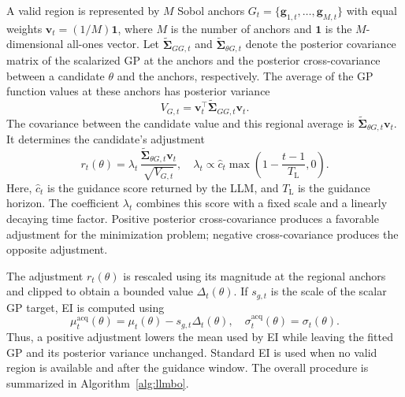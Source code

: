 \documentclass[lettersize,journal]{IEEEtran}
\begin{document}
A valid region is represented by $M$ Sobol anchors
$G_t=\{\mathbf g_{1,t},\ldots,\mathbf g_{M,t}\}$ with equal weights
$\mathbf v_t=(1/M)\mathbf 1$, where $M$ is the number of anchors and
$\mathbf 1$ is the $M$-dimensional all-ones vector. Let
$\widetilde{\boldsymbol\Sigma}_{GG,t}$ and
$\widetilde{\boldsymbol\Sigma}_{\theta G,t}$ denote the posterior covariance
matrix of the scalarized GP at the anchors and the posterior cross-covariance
between a candidate $\theta$ and the anchors, respectively. The average of
the GP function values at these anchors has posterior variance
\begin{equation}
 V_{G,t}=\mathbf v_t^{\top}
 \widetilde{\boldsymbol\Sigma}_{GG,t}\mathbf v_t.
 \label{eq:region_variance}
\end{equation}
The covariance between the candidate value and this regional average is
$\widetilde{\boldsymbol\Sigma}_{\theta G,t}\mathbf v_t$. It determines the
candidate's adjustment
\begin{equation}
 r_t(\theta)=
 \lambda_t\,
 \frac{\widetilde{\boldsymbol\Sigma}_{\theta G,t}\mathbf v_t}
 {\sqrt{V_{G,t}}},
 \quad
 \lambda_t\propto
 \widehat c_t\max\!\left(1-\frac{t-1}{T_{\mathrm L}},0\right).
 \label{eq:region_adjustment}
\end{equation}
Here, $\widehat c_t$ is the guidance score returned by the LLM, and
$T_{\mathrm L}$ is the guidance horizon. The coefficient $\lambda_t$ combines
this score with a fixed scale and a linearly decaying time factor. Positive posterior
cross-covariance produces a favorable adjustment for the minimization
problem; negative cross-covariance produces the opposite adjustment.

The adjustment $r_t(\theta)$ is rescaled using its magnitude at the regional
anchors and clipped to obtain a bounded value $\Delta_t(\theta)$. If
$s_{g,t}$ is the scale of the scalar GP target, EI is computed using
\begin{equation}
 \mu_t^{\mathrm{acq}}(\theta)
 =\mu_t(\theta)-s_{g,t}\Delta_t(\theta),
 \quad
 \sigma_t^{\mathrm{acq}}(\theta)=\sigma_t(\theta).
 \label{eq:region_acq_mean}
\end{equation}
Thus, a positive adjustment lowers the mean used by EI while leaving the
fitted GP and its posterior variance unchanged. Standard EI is used when no
valid region is available and after the guidance window.
The overall procedure is summarized in Algorithm~\ref{alg:llmbo}.
\end{document}
